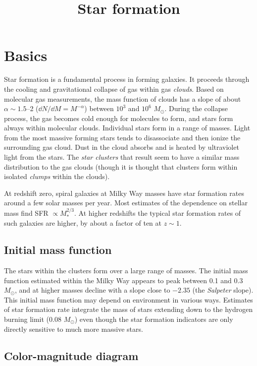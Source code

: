\title{\bf Star formation}

\section{Basics}

Star formation is a fundamental process in forming galaxies. It
proceeds through the cooling and gravitational collapse of gas within
gas {\it clouds}. Based on molecular gas measurements, the mass
function of clouds has a slope of about $\alpha\sim 1.5$--2
($\dd{N}/\dd{M} = M^{-\alpha}$) between $10^3$ and $10^6$ $M_\odot$.
During the collapse process, the gas becomes cold enough for molecules
to form, and stars form always within molecular clouds. Individual
stars form in a range of masses. Light from the most massive forming
stars tends to disassociate and then ionize the surrounding gas
cloud. Dust in the cloud absorbs and is heated by ultraviolet light
from the stars. The {\it star clusters} that result seem to have a
similar mass distribution to the gas clouds (though it is thought that
clusters form within isolated {\it clumps} within the clouds).

At redshift zero, spiral galaxies at Milky Way masses have star
formation rates around a few solar masses per year. Most estimates of
the dependence on stellar mass find SFR $\propto M_\ast^{2/3}$. At
higher redshifts the typical star formation rates of such galaxies are
higher, by about a factor of ten at $z\sim 1$.

\subsection{Initial mass function}

The stars within the clusters form over a large range of masses. The
initial mass function estimated within the Milky Way appears to peak
between 0.1 and 0.3 $M_\odot$, and at higher masses decline with a
slope close to $-2.35$ (the {\it Salpeter} slope). This initial mass
function may depend on environment in various ways.  Estimates of star
formation rate integrate the mass of stars extending down to the
hydrogen burning limit ($0.08$ $M_\odot$) even though the star
formation indicators are only directly sensitive to much more massive
stars.

\subsection{Color-magnitude diagram}

